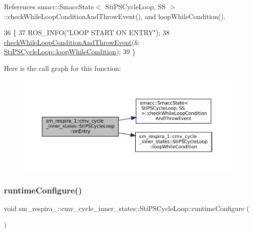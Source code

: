 References smacc\+::\+Smacc\+State$<$ Sti\+P\+S\+Cycle\+Loop, S\+S $>$\+::check\+While\+Loop\+Condition\+And\+Throw\+Event(), and loop\+While\+Condition().


\begin{DoxyCode}
36   \{
37     ROS\_INFO(\textcolor{stringliteral}{"LOOP START ON ENTRY"});
38     \hyperlink{classsmacc_1_1SmaccState_a80082718f226bebedb589f0c4696001d}{checkWhileLoopConditionAndThrowEvent}(&
      \hyperlink{structsm__respira__1_1_1cmv__cycle__inner__states_1_1StiPSCycleLoop_a0dbaf83715bbaca237b49d7739b7a993}{StiPSCycleLoop::loopWhileCondition});
39   \}
\end{DoxyCode}
Here is the call graph for this function\+:
\nopagebreak
\begin{figure}[H]
\begin{center}
\leavevmode
\includegraphics[width=350pt]{structsm__respira__1_1_1cmv__cycle__inner__states_1_1StiPSCycleLoop_aecd37369448382fa73cf481f58acc9fc_cgraph}
\end{center}
\end{figure}
\mbox{\label{structsm__respira__1_1_1cmv__cycle__inner__states_1_1StiPSCycleLoop_a0f5907ad97cc0722381330acaa7f78f5}} 
\subsubsection{\texorpdfstring{runtime\+Configure()}{runtimeConfigure()}}
{\footnotesize\ttfamily void sm\+\_\+respira\+\_\+::cmv\+\_\+cycle\+\_\+inner\+\_\+states\+::\+Sti\+P\+S\+Cycle\+Loop\+::runtime\+Configure (\begin{DoxyParamCaption}{ }\end{DoxyParamCaption})\hspace{0.3cm}{\ttfamily [inline]}}



